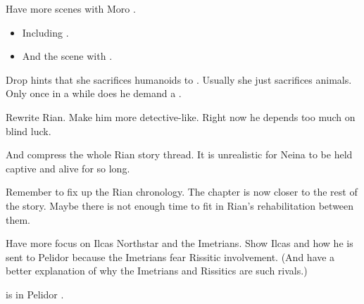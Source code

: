 \begin{changes}
  \begin{comment}\paragraph{Moro \Cobrel}\end{comment}
    Have more scenes with Moro \Cobrel.
    \begin{itemize}
      \item 
        Including . 
      \item 
        And the scene with . 
    \end{itemize}
  
    Drop hints that she sacrifices humanoids to \Nasshikerr.
    Usually she just sacrifices animals. 
    Only once in a while does he demand a \humanoid.

  \begin{comment}\paragraph{Rian}\end{comment}
    Rewrite Rian.
    Make him more detective-like.
    Right now he depends too much on blind luck. 
    
    And compress the whole Rian story thread. 
    It is unrealistic for Neina to be held captive and alive for so long. 
    
    Remember to fix up the Rian chronology. 
    The  chapter is now closer to the rest of the story. 
    Maybe there is not enough time to fit in Rian's rehabilitation between them. 

  
  \begin{comment}\paragraph{Telcastora Ilcas}\end{comment}
    Have more focus on Ilcas Northstar and the Imetrians. 
    Show Ilcas and how he is sent to Pelidor because the Imetrians fear Rissitic involvement. 
    (And have a better explanation of why the Imetrians and Rissitics are such rivals.)
  
  \begin{comment}
    \paragraph{\ChyrieEsmerel}
  \end{comment}
  \changesitem{\ChyrieEsmerel} 
    \Esmerel{} is in Pelidor . 
  

\end{changes}
